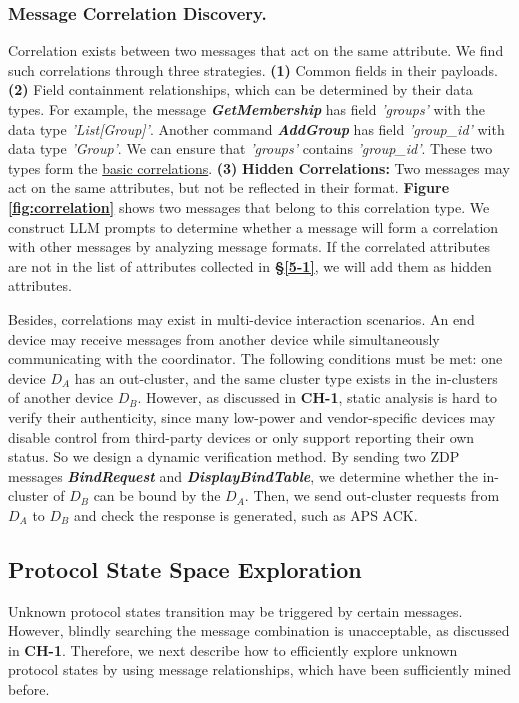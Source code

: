 \documentclass[10pt,journal,compsoc]{IEEEtran}
\begin{document}
\subsubsection{Message Correlation Discovery.}  Correlation exists between two messages that act on the same attribute. We find such correlations through three strategies. \textbf{(1)} Common fields in their payloads. \textbf{(2)} Field containment relationships, which can be determined by their data types. For example, the message \textbf{\emph{GetMembership}} has field \emph{'groups'} with the data type \emph{'List[Group]'}. Another command \textbf{\emph{AddGroup}} has field \emph{'group\_id'} with data type \emph{'Group'}. We can ensure that \emph{'groups'} contains \emph{'group\_id'}. These two types form the \underline{basic correlations}. \textbf{(3)} \textbf{Hidden Correlations:} Two messages may act on the same attributes, but not be reflected in their format. \textbf{Figure \ref{fig:correlation}} shows two messages that belong to this correlation type. We construct LLM prompts to determine whether a message will form a correlation with other messages by analyzing message formats. If the correlated attributes are not in the list of attributes collected in \textbf{\S\ref{5-1}}, we will add them as hidden attributes.

Besides, correlations may exist in multi-device interaction scenarios. An end device may receive messages from another device while simultaneously communicating with the coordinator. The following conditions must be met: one device $D_A$ has an out-cluster, and the same cluster type exists in the in-clusters of another device $D_B$. However, as discussed in \textbf{CH-1}, static analysis is hard to verify their authenticity, since many low-power and vendor-specific devices may disable control from third-party devices or only support reporting their own status. So we design a dynamic verification method. By sending two ZDP messages \textit{\textbf{BindRequest}} and \textit{\textbf{DisplayBindTable}}, we determine whether the in-cluster of $D_B$ can be bound by the $D_A$. Then, we send out-cluster requests from $D_A$ to $D_B$ and check the response is generated, such as APS ACK. 

\subsection{Protocol State Space Exploration} \label{4-3}
Unknown protocol states transition may be triggered by certain messages. However, blindly searching the message combination is unacceptable, as discussed in \textbf{CH-1}. Therefore, we next describe how to efficiently explore unknown protocol states by using message relationships, which have been sufficiently mined before.
\end{document}
